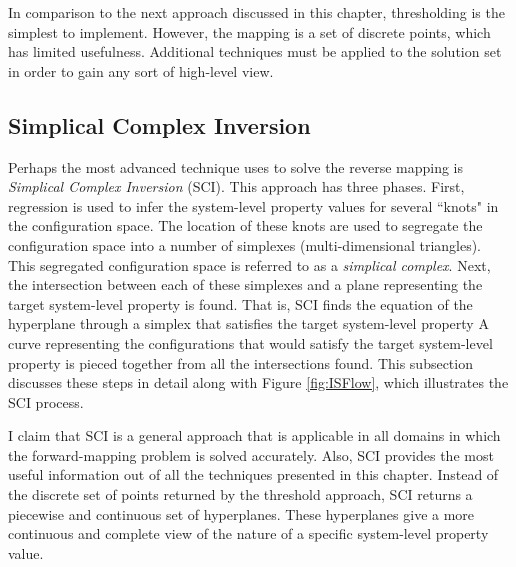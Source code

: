 In comparison to the next approach discussed in this chapter, thresholding is the simplest to implement.
However, the mapping is a set of discrete points, which has limited usefulness.
Additional techniques must be applied to the solution set in order to gain any sort of high-level view.

\subsection{Simplical Complex Inversion}

Perhaps the most advanced technique \fw uses to solve the reverse mapping is \textit{Simplical Complex Inversion} (SCI).
This approach has three phases.
First, regression is used to infer the system-level property values for several ``knots" in the configuration space.
The location of these knots are used to segregate the configuration space into a number of simplexes (multi-dimensional triangles).
This segregated configuration space is referred to as a \textit{simplical complex}.
Next, the intersection between each of these simplexes and a plane representing the target system-level property is found.
That is, SCI finds the equation of the hyperplane through a simplex that satisfies the target system-level property
A curve representing the configurations that would satisfy the target system-level property is pieced together from all the intersections found.
This subsection discusses these steps in detail along with Figure \ref{fig:ISFlow}, which illustrates the SCI process.

I claim that SCI is a general approach that is applicable in all domains in which the forward-mapping problem is solved accurately.
Also, SCI provides the most useful information out of all the techniques presented in this chapter.
Instead of the discrete set of points returned by the threshold approach, SCI returns a piecewise and continuous set of hyperplanes.
These hyperplanes give a more continuous and complete view of the nature of a specific system-level property value.

